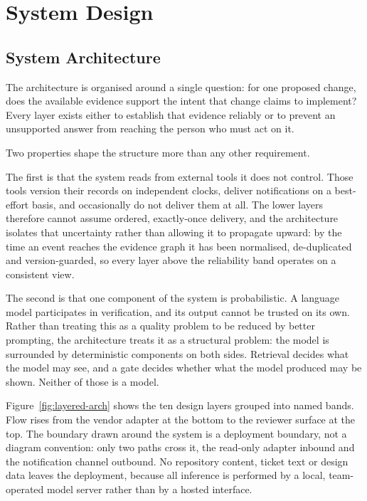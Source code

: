 \chapter{System Design}

\section{System Architecture}

The architecture is organised around a single question: for one proposed change,
does the available evidence support the intent that change claims to implement?
Every layer exists either to establish that evidence reliably or to prevent an
unsupported answer from reaching the person who must act on it.

Two properties shape the structure more than any other requirement.

The first is that the system reads from external tools it does not control.
Those tools version their records on independent clocks, deliver notifications
on a best-effort basis, and occasionally do not deliver them at all. The lower
layers therefore cannot assume ordered, exactly-once delivery, and the
architecture isolates that uncertainty rather than allowing it to propagate
upward: by the time an event reaches the evidence graph it has been normalised,
de-duplicated and version-guarded, so every layer above the reliability band
operates on a consistent view.

The second is that one component of the system is probabilistic. A language
model participates in verification, and its output cannot be trusted on its own.
Rather than treating this as a quality problem to be reduced by better prompting,
the architecture treats it as a structural problem: the model is surrounded by
deterministic components on both sides. Retrieval decides what the model may
see, and a gate decides whether what the model produced may be shown. Neither of
those is a model.

Figure~\ref{fig:layered-arch} shows the ten design layers grouped into named
bands. Flow rises from the vendor adapter at the bottom to the reviewer surface
at the top. The boundary drawn around the system is a deployment boundary, not a
diagram convention: only two paths cross it, the read-only adapter inbound and
the notification channel outbound. No repository content, ticket text or design
data leaves the deployment, because all inference is performed by a local,
team-operated model server rather than by a hosted interface.

